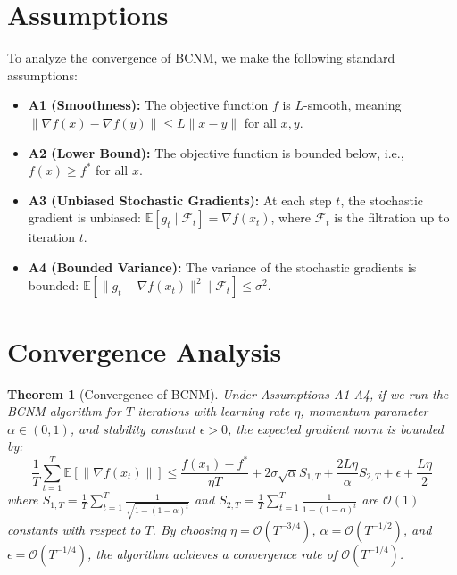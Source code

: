 \documentclass{article}
\newtheorem{theorem}{Theorem}
\begin{document}
\section*{Assumptions}
To analyze the convergence of BCNM, we make the following standard assumptions:
\begin{itemize}
    \item \textbf{A1 (Smoothness):} The objective function $f$ is $L$-smooth, meaning $\|\nabla f(x) - \nabla f(y)\| \le L\|x - y\|$ for all $x, y$.
    \item \textbf{A2 (Lower Bound):} The objective function is bounded below, i.e., $f(x) \ge f^*$ for all $x$.
    \item \textbf{A3 (Unbiased Stochastic Gradients):} At each step $t$, the stochastic gradient is unbiased: $\mathbb{E}[g_t \mid \mathcal{F}_t] = \nabla f(x_t)$, where $\mathcal{F}_t$ is the filtration up to iteration $t$.
    \item \textbf{A4 (Bounded Variance):} The variance of the stochastic gradients is bounded: $\mathbb{E}[\|g_t - \nabla f(x_t)\|^2 \mid \mathcal{F}_t] \le \sigma^2$.
\end{itemize}

\section*{Convergence Analysis}
\begin{theorem}[Convergence of BCNM]
Under Assumptions A1-A4, if we run the BCNM algorithm for $T$ iterations with learning rate $\eta$, momentum parameter $\alpha \in (0, 1)$, and stability constant $\epsilon > 0$, the expected gradient norm is bounded by:
$$ \frac{1}{T} \sum_{t=1}^T \mathbb{E}[\|\nabla f(x_t)\|] \le \frac{f(x_1) - f^*}{\eta T} + 2\sigma\sqrt{\alpha} S_{1,T} + \frac{2L\eta}{\alpha} S_{2,T} + \epsilon + \frac{L\eta}{2} $$
where $S_{1,T} = \frac{1}{T} \sum_{t=1}^T \frac{1}{\sqrt{1-(1-\alpha)^t}}$ and $S_{2,T} = \frac{1}{T} \sum_{t=1}^T \frac{1}{1-(1-\alpha)^t}$ are $\mathcal{O}(1)$ constants with respect to $T$.
By choosing $\eta = \mathcal{O}(T^{-3/4})$, $\alpha = \mathcal{O}(T^{-1/2})$, and $\epsilon = \mathcal{O}(T^{-1/4})$, the algorithm achieves a convergence rate of $\mathcal{O}(T^{-1/4})$.
\end{theorem}
\end{document}
